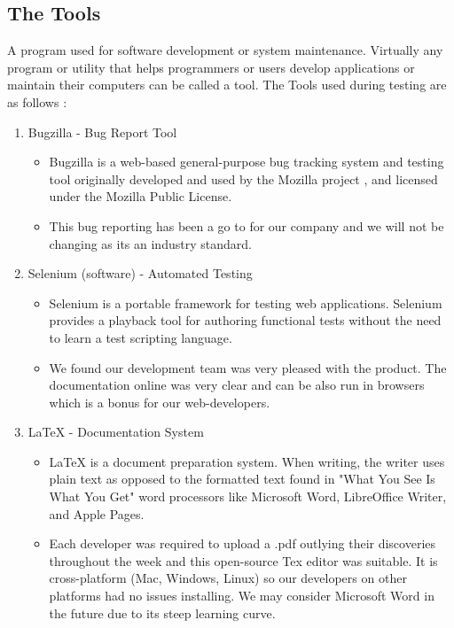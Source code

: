 \subsection{The Tools}


A program used for software development or system maintenance. Virtually any program
or utility that helps programmers
or users develop applications or maintain their computers can be called a tool.
The Tools used during testing are as follows :

\begin{enumerate}
   \item Bugzilla - Bug Report Tool
   \begin{itemize}
     \item Bugzilla is a web-based general-purpose bug tracking system and testing tool originally developed and used by the Mozilla project
     , and licensed under the Mozilla Public License.

      \item This bug reporting has been a go to for our company and we will not be changing as its an industry standard.
   \end{itemize}
   \item Selenium (software) - Automated Testing
   \begin{itemize}
     \item Selenium is a portable framework for testing web applications. Selenium provides a playback tool for authoring
      functional tests without the need to learn a test scripting language.

         \item We found our development team was very pleased with the product. The documentation online was very clear and can be also run in browsers which is a bonus for our web-developers.
   \end{itemize}

   \item  LaTeX - Documentation System
   \begin{itemize}
     \item LaTeX is a document preparation system. When writing, the writer uses plain text as opposed to the formatted text found in "What You See Is What You Get"
      word processors like Microsoft Word, LibreOffice Writer, and Apple Pages.


       \item Each developer was required to upload a .pdf outlying their discoveries throughout the week and this open-source Tex editor was suitable. It is cross-platform (Mac, Windows, Linux) so our developers on other platforms had no issues installing. We may consider Microsoft Word in the future due to its steep learning curve.
   \end{itemize}



\end{enumerate}
